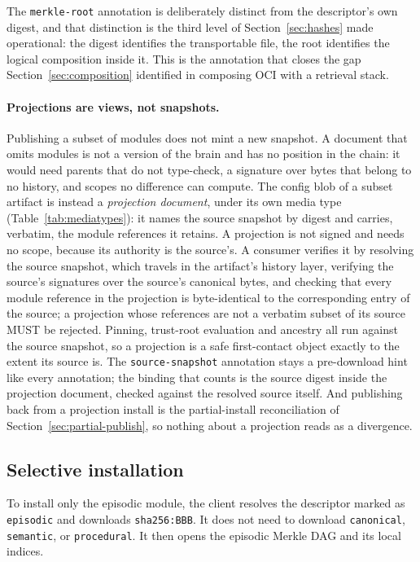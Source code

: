 \documentclass[11pt,a4paper]{article}
\begin{document}
The \texttt{merkle-root} annotation is deliberately distinct from the
descriptor's own digest, and that distinction is the third level of
Section~\ref{sec:hashes} made operational: the digest identifies the
transportable file, the root identifies the logical composition inside it.
This is the annotation that closes the gap Section~\ref{sec:composition}
identified in composing OCI with a retrieval stack.

\paragraph{Projections are views, not snapshots.} Publishing a subset of
modules does not mint a new snapshot. A document that omits modules is not a
version of the brain and has no position in the chain: it would need parents
that do not type-check, a signature over bytes that belong to no history, and
scopes no difference can compute. The config blob of a subset artifact is
instead a \emph{projection document}, under its own media type
(Table~\ref{tab:mediatypes}): it names the source snapshot by digest and
carries, verbatim, the module references it retains. A projection is not
signed and needs no scope, because its authority is the source's. A consumer
verifies it by resolving the source snapshot, which travels in the artifact's
history layer, verifying the source's signatures over the source's canonical
bytes, and checking that every module reference in the projection is
byte-identical to the corresponding entry of the source; a projection whose
references are not a verbatim subset of its source MUST be rejected. Pinning,
trust-root evaluation and ancestry all run against the source snapshot, so a
projection is a safe first-contact object exactly to the extent its source is.
The \texttt{source-snapshot} annotation stays a pre-download hint like every
annotation; the binding that counts is the source digest inside the projection
document, checked against the resolved source itself. And publishing back from
a projection install is the partial-install reconciliation of
Section~\ref{sec:partial-publish}, so nothing about a projection reads as a
divergence.

\subsection{Selective installation}
\label{sec:selective}

To install only the episodic module, the client resolves the descriptor marked
as \texttt{episodic} and downloads \texttt{sha256:BBB}. It does not need to
download \texttt{canonical}, \texttt{semantic}, or \texttt{procedural}. It then
opens the episodic Merkle DAG and its local indices.
\end{document}
